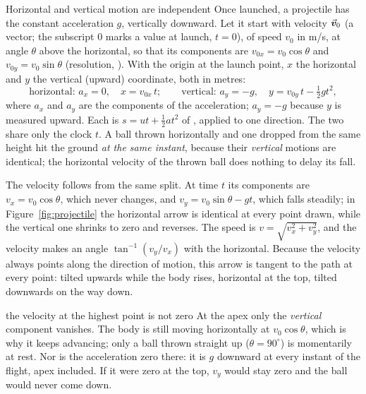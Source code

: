 \begin{keybox}{Horizontal and vertical motion are independent}
Once launched, a projectile has the constant acceleration $g$, vertically downward. Let it start with
velocity $\vec{\bm{v}}_0$ (a vector; the subscript $0$ marks a value at launch, $t=0$), of speed $v_0$ in
\si{m/s}, at angle $\theta$ above the horizontal, so that its components are
$v_{0x}=v_0\cos\theta$ and $v_{0y}=v_0\sin\theta$ (resolution, ). With the origin at the
launch point, $x$ the horizontal and $y$ the vertical (upward) coordinate, both in metres:
\[
\text{horizontal: } a_x=0,\quad x=v_{0x}\,t;\qquad
\text{vertical: } a_y=-g,\quad y=v_{0y}\,t-\tfrac12 g t^2,
\]
where $a_x$ and $a_y$ are the components of the acceleration; $a_y=-g$ because $y$ is measured upward.
Each is $s=ut+\tfrac12at^2$ of , applied to one direction.
The two share only the clock $t$. A ball thrown horizontally and one dropped from the same height hit
the ground \emph{at the same instant}, because their \emph{vertical} motions are identical; the
horizontal velocity of the thrown ball does nothing to delay its fall.
\end{keybox}

The velocity follows from the same split. At time $t$ its components are $v_x=v_0\cos\theta$, which
never changes, and $v_y=v_0\sin\theta-gt$, which falls steadily; in Figure~\ref{fig:projectile} the
horizontal arrow is identical at every point drawn, while the vertical one shrinks to zero and reverses. The speed is
$v=\sqrt{v_x^2+v_y^2}$, and the velocity makes an angle $\tan^{-1}(v_y/v_x)$ with the horizontal. Because the velocity always points along the direction of motion, this arrow is
tangent to the path at every point: tilted upwards while the body rises, horizontal at the top, tilted
downwards on the way down.

\begin{trapbox}{the velocity at the highest point is not zero}
At the apex only the \emph{vertical} component vanishes. The body is still moving horizontally at
$v_0\cos\theta$, which is why it keeps advancing; only a ball thrown straight up ($\theta=90^\circ$)
is momentarily at rest. Nor is the acceleration zero there: it is $g$ downward at every instant of the
flight, apex included. If it were zero at the top, $v_y$ would stay zero and the ball would never come
down.
\end{trapbox}

\begin{figure}[htbp]
\centering
{}
\end{figure}

